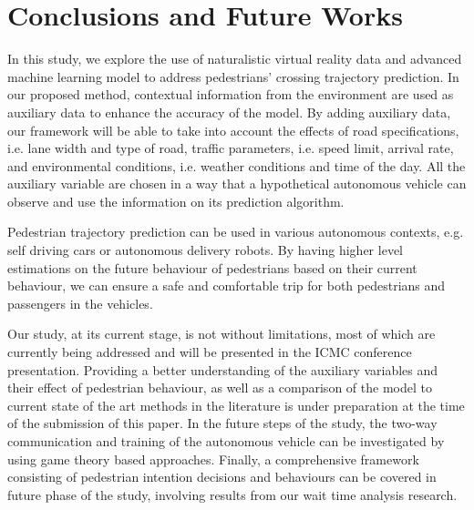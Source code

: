 \section{Conclusions and Future Works}
\label{S:T6}
In this study, we explore the use of naturalistic virtual reality data and advanced machine learning model to address pedestrians' crossing trajectory prediction. In our proposed method, contextual information from the environment are used as auxiliary data to enhance the accuracy of the model. By adding auxiliary data, our framework will be able to take into account the effects of road specifications, i.e. lane width and type of road, traffic parameters, i.e. speed limit, arrival rate, and environmental conditions, i.e. weather conditions and time of the day. All the auxiliary variable are chosen in a way that a hypothetical autonomous vehicle can observe and use the information on its prediction algorithm.

Pedestrian trajectory prediction can be used in various autonomous contexts, e.g. self driving cars or autonomous delivery robots. By having higher level estimations on the future behaviour of pedestrians based on their current behaviour, we can ensure a safe and comfortable trip for both pedestrians and passengers in the vehicles.

Our study, at its current stage, is not without limitations, most of which are currently being addressed and will be presented in the ICMC conference presentation. Providing a better understanding of the auxiliary variables and their effect of pedestrian behaviour, as well as a comparison of the model to current state of the art methods in the literature is under preparation at the time of the submission of this paper. In the future steps of the study, the two-way communication and training of the autonomous vehicle can be investigated by using game theory based approaches. Finally, a comprehensive framework consisting of pedestrian intention decisions and behaviours can be covered in future phase of the study, involving results from our wait time analysis research.